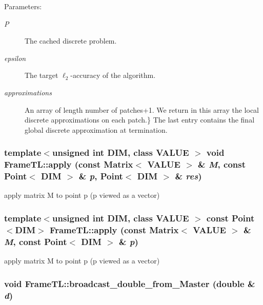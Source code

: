 \begin{Desc}
\item[Parameters:]
\begin{description}
\item[{\em P}]The cached discrete problem. \item[{\em epsilon}]The target $\ell_2$-accuracy of the algorithm. \item[{\em approximations}]An array of length number of patches+1. We return in this array the local discrete approximations on each patch.\} The last entry contains the final global discrete approximation at termination. \end{description}
\end{Desc}
\hypertarget{namespaceFrameTL_7f2d7a0a9f79b15e8d82ff8363d06bb5}{
\subsubsection[{apply}]{\setlength{\rightskip}{0pt plus 5cm}template$<$unsigned int DIM, class VALUE $>$ void FrameTL::apply (const Matrix$<$ VALUE $>$ \& {\em M}, \/  const Point$<$ DIM $>$ \& {\em p}, \/  Point$<$ DIM $>$ \& {\em res})}}
\label{namespaceFrameTL_7f2d7a0a9f79b15e8d82ff8363d06bb5}


apply matrix M to point p (p viewed as a vector) \hypertarget{namespaceFrameTL_110b0b11455f5d648c2cb3a7866f3900}{
\subsubsection[{apply}]{\setlength{\rightskip}{0pt plus 5cm}template$<$unsigned int DIM, class VALUE $>$ const Point$<$DIM$>$ FrameTL::apply (const Matrix$<$ VALUE $>$ \& {\em M}, \/  const Point$<$ DIM $>$ \& {\em p})}}
\label{namespaceFrameTL_110b0b11455f5d648c2cb3a7866f3900}


apply matrix M to point p (p viewed as a vector) \hypertarget{namespaceFrameTL_5b01ba18f76ca06fb77d8cbca90492e8}{
\subsubsection[{broadcast\_\-double\_\-from\_\-Master}]{\setlength{\rightskip}{0pt plus 5cm}void FrameTL::broadcast\_\-double\_\-from\_\-Master (double \& {\em d})}}
\label{namespaceFrameTL_5b01ba18f76ca06fb77d8cbca90492e8}


